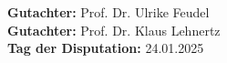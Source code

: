\newpage  %


\vspace*{\fill}  %
\begin{flushleft}
	\large
    \textbf{Gutachter:} Prof. Dr. Ulrike Feudel  \\[0.2cm]
    \textbf{Gutachter:} Prof. Dr. Klaus Lehnertz \\[0.2cm]
    \textbf{Tag der Disputation:} 24.01.2025 
\end{flushleft}

\newpage  %
